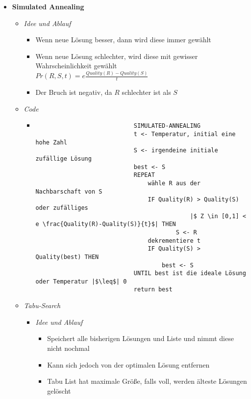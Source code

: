 \begin{itemize}
        \item \textbf{Simulated Annealing}
            \begin{itemize}
                \item \textit{Idee und Ablauf}
                    \begin{itemize}
                        \item Wenn neue Lösung besser, dann wird diese immer gewählt
                        \item Wenn neue Lösung schlechter, wird diese mit gewisser Wahrscheinlichkeit gewählt \\
                                $Pr(R,S,t) = e \frac{Quality(R)-Quality(S)}{t}$
                        \item Der Bruch ist negativ, da $R$ schlechter ist als $S$
                    \end{itemize}

                \item \textit{Code}
                    \begin{itemize}
                        \item[]
                            \begin{verbatim}
                            SIMULATED-ANNEALING
                            t <- Temperatur, initial eine hohe Zahl
                            S <- irgendeine initiale zufällige Lösung
                            best <- S
                            REPEAT
                                wähle R aus der Nachbarschaft von S
                                IF Quality(R) > Quality(S) oder zufälliges
                                            |$ Z \in [0,1] < e \frac{Quality(R)-Quality(S)}{t}$| THEN
                                        S <- R
                                dekrementiere t
                                IF Quality(S) > Quality(best) THEN
                                    best <- S 
                            UNTIL best ist die ideale Lösung oder Temperatur |$\leq$| 0
                            return best
                            \end{verbatim}
                    \end{itemize}

                \item \textit{Tabu-Search}
                    \begin{itemize}
                        \item \textit{Idee und Ablauf}
                            \begin{itemize}
                                \item Speichert alle bisherigen Lösungen und Liste und nimmt diese nicht nochmal
                                \item Kann sich jedoch von der optimalen Lösung entfernen
                                \item Tabu List hat maximale Grö\ss e, falls voll, werden älteste Lösungen gelöscht
                            \end{itemize}
                        

\end{itemize}
\end{itemize}
\end{itemize}
